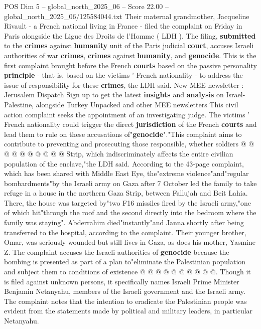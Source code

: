 \begin{textsample}{POS Dim 5 – global\_north\_2025\_06 – Score 22.00 – global\_north\_2025\_06/125584044.txt}  \label{ex:f5_pos_063}
Their maternal grandmother, Jacqueline Rivault - a French national living in France - filed the complaint on Friday in Paris alongside the Ligue des Droits de l'Homme ( LDH ).
The filing, \textbf{submitted} to the \textbf{crimes} against \textbf{humanity} unit of the Paris judicial \textbf{court}, accuses Israeli authorities of war \textbf{crimes}, \textbf{crimes} against \textbf{humanity}, and \textbf{genocide}.
This is the first complaint brought before the French \textbf{courts} based on the passive personality \textbf{principle} - that is, based on the victims ' French nationality - to address the issue of responsibility for these \textbf{crimes}, the LDH said.
New MEE newsletter : Jerusalem Dispatch Sign up to get the latest \textbf{insights} and \textbf{analysis} on Israel-Palestine, alongside Turkey Unpacked and other MEE newsletters This civil action complaint seeks the appointment of an investigating judge.
The victims ' French nationality could trigger the direct \textbf{jurisdiction} of the French \textbf{courts} and lead them to rule on these accusations of"\textbf{genocide}"."This complaint aims to contribute to preventing and prosecuting those responsible, whether soldiers @ @ @ @ @ @ @ @ @ @ Strip, which indiscriminately affects the entire civilian population of the enclave,"the LDH said.
According to the 43-page complaint, which has been shared with Middle East Eye, the"extreme violence"and"regular bombardments"by the Israeli army on Gaza after 7 October led the family to take refuge in a house in the northern Gaza Strip, between Fallujah and Beit Lahia.
There, the house was targeted by"two F16 missiles fired by the Israeli army,"one of which hit"through the roof and the second directly into the bedroom where the family was staying".
Abderrahim died"instantly"and Janna shortly after being transferred to the hospital, according to the complaint.
Their younger brother, Omar, was seriously wounded but still lives in Gaza, as does his mother, Yasmine Z.
The complaint accuses the Israeli authorities of \textbf{genocide} because the bombing is presented as part of a plan to"eliminate the Palestinian population and subject them to conditions of existence @ @ @ @ @ @ @ @ @ @.
Though it is filed against unknown persons, it specifically names Israeli Prime Minister Benjamin Netanyahu, members of the Israeli government and the Israeli army.
The complaint notes that the intention to eradicate the Palestinian people was evident from the statements made by political and military leaders, in particular Netanyahu.

\end{textsample}
